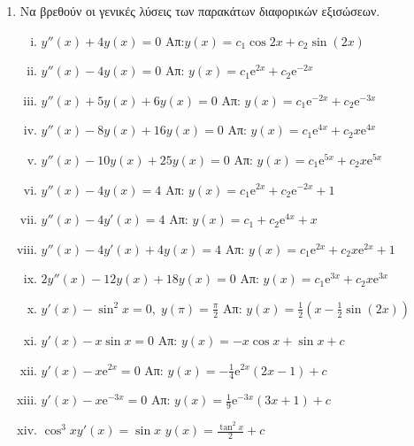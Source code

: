 \begin{enumerate}
  \item Να βρεθούν οι γενικές λύσεις των παρακάτων διαφορικών εξισώσεων. 
    \begin{enumerate}[i)]
      \item $ y''(x) + 4y(x) = 0 $
        \hfill Απ:$ y(x) = c_{1} \cos{2x} + c_{2} \sin{(2x)} $ 
      \item $ y''(x) - 4y(x) = 0 $ 
        \hfill Απ: $ y(x) = c_{1} \mathrm{e}^{2x} + c_{2} \mathrm{e}^{-2 x} $ 
      \item $ y''(x) + 5y(x)+6y(x)=0 $ 
        \hfill Απ: $ y(x) = c_{1} \mathrm{e}^{-2x} + c_{2} \mathrm{e}^{-3x} $ 
      \item $ y''(x) - 8y(x)+16y(x)=0 $
        \hfill Απ: $ y(x) = c_{1} \mathrm{e}^{4x} + c_{2}x \mathrm{e}^{4x} $ 
      \item $ y''(x) - 10y(x)+25y(x)=0 $
        \hfill Απ: $ y(x) = c_{1} \mathrm{e}^{5x} + c_{2}x \mathrm{e}^{5x} $ 
      \item $ y''(x) - 4y(x) = 4 $
        \hfill Απ: $ y(x) = c_{1} \mathrm{e}^{2x} + c_{2} \mathrm{e}^{-2 x} +1 $ 
      \item $ y''(x) - 4y'(x) = 4 $
        \hfill Απ: $ y(x) = c_{1} + c_{2} \mathrm{e}^{4 x} +x $ 
      \item $ y''(x) - 4y'(x)+4y(x) = 4 $
        \hfill Απ: $ y(x) = c_{1} \mathrm{e}^{2x} + c_{2} x \mathrm{e}^{2 x} +1 $ 
      \item $ 2y''(x) - 12y(x)+18y(x)=0 $
        \hfill Απ: $ y(x) = c_{1} \mathrm{e}^{3x} + c_{2} x \mathrm{e}^{3 x}  $ 
      \item $ y'(x) - \sin^{2}{x} = 0, \; y(\pi) = \frac{\pi}{2} $
        \hfill Απ: $ y(x) = \frac{1}{2} (x - \frac{1}{2} \sin{(2x)}) $ 
      \item $ y'(x) - x\sin{x} = 0 $
        \hfill Απ: $ y(x) = -x \cos{x} + \sin{x} + c $ 
      \item $ y'(x) - x \mathrm{e}^{2x} = 0 $
        \hfill Απ: $ y(x) = - \frac{1}{4} \mathrm{e}^{2x} (2x-1) + c $  
      \item $ y'(x) - x \mathrm{e}^{-3x} = 0 $
        \hfill Απ: $ y(x) =  \frac{1}{9} \mathrm{e}^{-3x} (3x+1) + c $  
      \item $ \cos^{3}{x} y'(x) = \sin{x} $
        $ y(x) = \frac{\tan^{2}{x}}{2} + c $
    \end{enumerate}


\end{enumerate}
